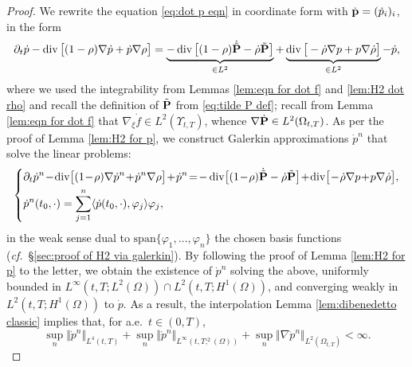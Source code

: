 \documentclass[11pt,a4paper,reqno]{amsart}
\theoremstyle{remark}
\theoremstyle{definition}
\numberwithin{equation}{section}
\DeclareMathOperator{\dv}{div}
\renewcommand{\span}{\mathrm{span}}
\renewcommand{\P}{{\bf P}}
\newcommand{\p}{{\bf p}}
\newcommand{\bxi}{\xi}
\begin{document}
\begin{proof}
    We rewrite the equation \eqref{eq:dot p eqn} in coordinate form with $\dot{\p} = (\dot{p}_i)_i$, in the form 
    \begin{equation*}
    \partial_t \dot{p} - \dv \big[ {(1-\rho) \nabla \dot{p} +  \dot{p} \nabla \rho} \big] = \underbrace{- \dv\big[  (1-\rho)\dot{\tilde{\P}} - \dot{\rho} \tilde{\P}   \big]}_{\in L^2} + \underbrace{\dv \big[  - \dot{\rho} \nabla p + p \nabla \dot{\rho}    \big]}_{\in L^2} - \dot{p}, 
\end{equation*}
where we used the integrability from Lemmas \ref{lem:eqn for dot f} and \ref{lem:H2 dot rho} and recall the definition of $\tilde{\P}$ from \eqref{eq:tilde P def}; recall from Lemma \ref{lem:eqn for dot f} that $\nabla_{\bxi} \dot{f} \in L^2(\Upsilon_{t,T})$, whence $\nabla \dot{\P} \in L^2(\Omega_{t,T})$. As per the proof of Lemma \ref{lem:H2 for p}, we construct Galerkin approximations $\dot{p}^n$ that solve the linear problems: 
\begin{equation}
    \left\lbrace \begin{aligned}
        &\partial_t \dot{p}^n \!-\! \dv\! \big[ (1\!-\!\rho) \nabla \dot{p}^n \!+\! \dot{p}^n \nabla \rho   \big] \! +\! \dot{p}^n \!=\! - \dv\!\big[ (1\!-\!\rho)\dot{\tilde{\P}} - \dot{\rho} \tilde{\P}  \big]\! +\! \dv \!\big[ \!-\! \dot{\rho} \nabla p \!+\! p \nabla \dot{\rho}   \big], \\ 
        &\dot{p}^n(t_0,\cdot) = \sum_{j=1}^n \langle \dot{p}(t_0,\cdot),\varphi_j \rangle \varphi_j, 
    \end{aligned}  \right. 
\end{equation}
in the weak sense dual to $\span\{\varphi_1,\dots,\varphi_n\}$ the chosen basis functions (\textit{cf.}~\S \ref{sec:proof of H2 via galerkin}). By following the proof of Lemma \ref{lem:H2 for p} to the letter, we obtain the existence of $\dot{p}^n$ solving the above, uniformly bounded in $L^\infty(t,T;L^2(\Omega)) \cap L^2(t,T;H^1(\Omega))$, and converging weakly in $L^2(t,T;H^1(\Omega))$ to $\dot{p}$. As a result, the interpolation  Lemma \ref{lem:dibenedetto classic} implies that, for a.e.~$t \in (0,T)$, 
\begin{equation}\label{eq:dot p n galerkin unif bounded Lq}
    \sup_n \Vert \dot{p}^n \Vert_{L^4(t,T)} + \sup_n \Vert \dot{p}^n \Vert_{L^\infty(t,T;^2(\Omega))} + \sup_n \Vert \nabla \dot{p}^n \Vert_{L^2(\Omega_{t,T})} < \infty.
\end{equation}



\end{proof}
\end{document}
